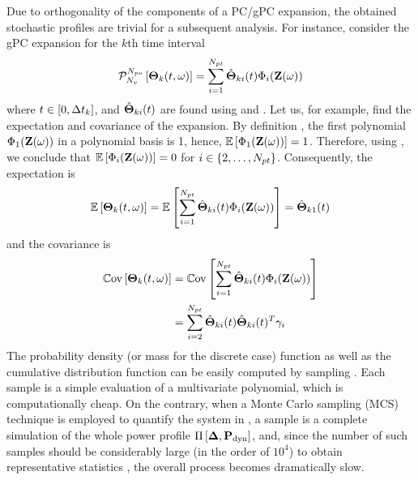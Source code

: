 Due to orthogonality of the components of a PC/gPC expansion, the obtained stochastic profiles are trivial for a subsequent analysis. For instance, consider the gPC expansion for the $k$th time interval
\begin{equation} \elabel{pc-k}
  \oPC{\vars}{\pcorder}{\vTO_k(\t, \o)} = \sum_{i = 1}^{\pcterms} \pcc{\vTO}_{ki}(\t) \pcb_i(\vZ(\o))
\end{equation}
where $t \in [0, \Delta t_k]$, and $\hat{{\boldsymbol\Theta}}_{ki}(t)$ are found using  and . Let us, for example, find the expectation and covariance of the expansion. By definition \cite{xiu2002}, the first polynomial $\Phi_1(\mathbf{Z}(\omega))$ in a polynomial basis is 1, hence, $\mathbb{E}\left[\Phi_1(\mathbf{Z}(\omega))\right] = 1$. Therefore, using , we conclude that $\mathbb{E}\left[\Phi_i(\mathbf{Z}(\omega))\right] = 0$ for $i \in \{ 2, \dotsc, {N_{pt}} \}$. Consequently, the expectation is
\[
  \mathbb{E}\left[{\boldsymbol\Theta}_k(t, \omega)\right] = \mathbb{E}\left[\sum_{i = 1}^{{N_{pt}}} \hat{{\boldsymbol\Theta}}_{ki}(t) \Phi_i(\mathbf{Z}(\omega))\right] = \hat{{\boldsymbol\Theta}}_{k1}(t)
\]
and the covariance is
\begin{align*}
  \mathbb{C}\text{ov}\left[{\boldsymbol\Theta}_k(t, \omega)\right] & = \mathbb{C}\text{ov}\left[\sum_{i = 1}^{{N_{pt}}} \hat{{\boldsymbol\Theta}}_{ki}(t) \Phi_i(\mathbf{Z}(\omega))\right] \\
  & = \sum_{i = 2}^{{N_{pt}}} \hat{{\boldsymbol\Theta}}_{ki}(t) \hat{{\boldsymbol\Theta}}_{ki}(t)^T \gamma_i
\end{align*}
The probability density (or mass for the discrete case) function as well as the cumulative distribution function can be easily computed by sampling . Each sample is a simple evaluation of a multivariate polynomial, which is computationally cheap. On the contrary, when a Monte Carlo sampling (MCS) technique is employed to quantify the system in , a sample is a complete simulation of the whole power profile $\prof{\mP_\dyn}$, and, since the number of such samples should be considerably large (in the order of $10^4$) to obtain representative statistics \cite{xiu2009}, the overall process becomes dramatically slow.
